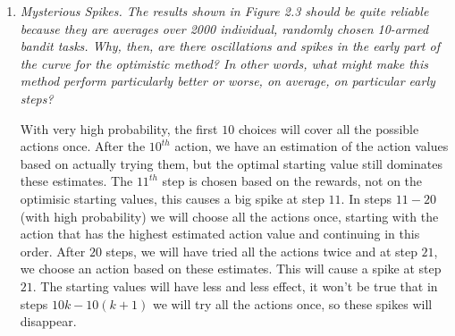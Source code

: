 \documentclass[12pt,a4paper]{article}
\begin{document}
\begin{enumerate}
\item
  \textit{Mysterious Spikes. The results shown in Figure 2.3 should be quite reliable
  because they are averages over 2000 individual, randomly chosen 10-armed bandit tasks.
  Why, then, are there oscillations and spikes in the early part of the curve for
  the optimistic method? In other words, what might make this method
  perform particularly better or worse, on average, on particular early steps?}

  With very high probability, the first $10$ choices will cover all the possible actions
  once. After the $10^{th}$ action, we have an estimation of the action values based
  on actually trying them, but the optimal starting value still dominates these estimates.
  The $11^{th}$ step is chosen based on the rewards, not on the optimisic starting values,
  this causes a big spike at step $11$. In steps $11-20$ (with high probability) we will
  choose all the actions once, starting with the action that has the highest estimated
  action value and continuing in this order. After $20$ steps, we will have tried all
  the actions twice and at step $21$, we choose an action based on these estimates.
  This will cause a spike at step $21$.
  The starting values will have less and less effect, it won't be true that in steps
  $10k - 10(k + 1)$ we will try all the actions once, so these spikes will disappear.


\end{enumerate}
\end{document}
